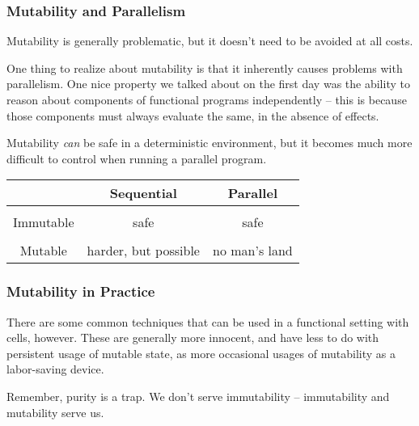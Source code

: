 \documentclass[aspectratio=169]{beamer}
\begin{document}
\begin{frame}[fragile]
  \frametitle{Mutability and Parallelism}

  Mutability is generally problematic, but it doesn't need to be avoided at all
  costs.

  \pause
  \vspace{\fill}

  One thing to realize about mutability is that it inherently causes problems
  with parallelism. One nice property we talked about on the first day was
  the ability to reason about components of functional programs independently --
  this is because those components must always evaluate the same, in the absence
  of effects.

  \pause
  \vspace{\fill}

  Mutability \textit{can} be safe in a deterministic environment, but it becomes
  much more difficult to control when running a parallel program.

  \vspace{\fill}

  \begin{center}
    \begin{tabular}{ c|c|c }
     & Sequential & Parallel \\
    \hline & \\[-1.5ex]
    Immutable & {\color{green!70!black}safe} & {\color{green!70!black}safe} \\ [0.5ex]
    \hline & \\[-1.5ex]
    Mutable & {\color{orange} harder, but possible} & {\color{red} no man's land}
    \end{tabular}
  \end{center}
\end{frame}

\begin{frame}[fragile]
  \frametitle{Mutability in Practice}

  There are some common techniques that can be used in a functional setting
  with  cells, however. These are generally more innocent, and have
  less to do with persistent usage of mutable state, as more occasional
  usages of mutability as a labor-saving device.

  \pause
  \vspace{\fill}

  Remember, purity is a trap. We don't serve immutability -- immutability and
  mutability serve us.
\end{frame}
\end{document}
